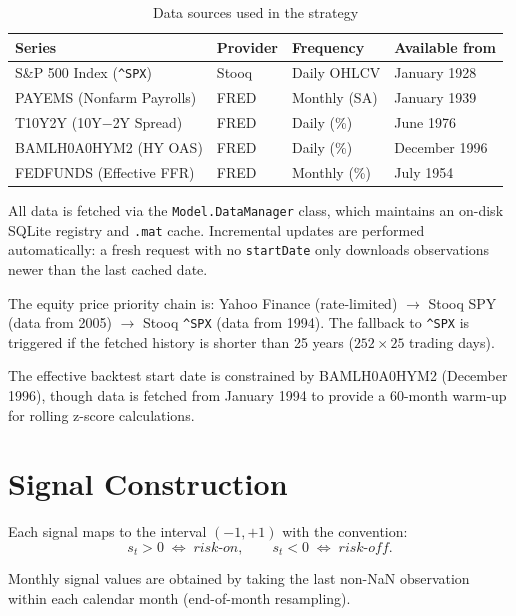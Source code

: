 \documentclass[11pt, a4paper]{article}
\begin{document}
\begin{table}[H]
\centering
\caption{Data sources used in the strategy}
\label{tab:data-sources}
\begin{tabular}{llll}
\toprule
\textbf{Series} & \textbf{Provider} & \textbf{Frequency} & \textbf{Available from} \\
\midrule
S\&P 500 Index (\texttt{\^{}SPX}) & Stooq & Daily OHLCV   & January 1928 \\
PAYEMS (Nonfarm Payrolls)    & FRED  & Monthly (SA)  & January 1939 \\
T10Y2Y (10Y$-$2Y Spread)     & FRED  & Daily (\%)    & June 1976 \\
BAMLH0A0HYM2 (HY OAS)        & FRED  & Daily (\%)    & December 1996 \\
FEDFUNDS (Effective FFR)     & FRED  & Monthly (\%)  & July 1954 \\
\bottomrule
\end{tabular}
\end{table}

All data is fetched via the \texttt{Model.DataManager} class, which
maintains an on-disk SQLite registry and \texttt{.mat} cache. Incremental
updates are performed automatically: a fresh request with no \texttt{startDate}
only downloads observations newer than the last cached date.

The equity price priority chain is:
Yahoo Finance (rate-limited) $\rightarrow$ Stooq SPY (data from 2005)
$\rightarrow$ Stooq \texttt{\^{}SPX} (data from 1994). The fallback to
\texttt{\^{}SPX} is triggered if the fetched history is shorter than 25 years
($252 \times 25$ trading days).

The effective backtest start date is constrained by BAMLH0A0HYM2
(December 1996), though data is fetched from January 1994 to provide a
60-month warm-up for rolling z-score calculations.

\section{Signal Construction}
\label{sec:signals}

Each signal maps to the interval $(-1, +1)$ with the convention:
\[
  s_t > 0 \;\Leftrightarrow\; \textit{risk-on}, \qquad
  s_t < 0 \;\Leftrightarrow\; \textit{risk-off}.
\]

Monthly signal values are obtained by taking the last non-NaN observation
within each calendar month (end-of-month resampling).
\end{document}
